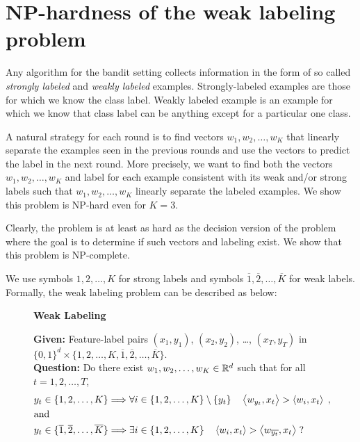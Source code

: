 \section{NP-hardness of the weak labeling problem}
\label{section:np-hardness-of-weak-labeling-problem}

Any algorithm for the bandit setting collects information in the form of so
called \emph{strongly labeled} and \emph{weakly labeled} examples.
Strongly-labeled examples are those for which we know the class label. Weakly
labeled example is an example for which we know that class label can be anything
except for a particular one class.

A natural strategy for each round is to find vectors $w_1, w_2, \dots, w_K$ that
linearly separate the examples seen in the previous rounds and use the vectors
to predict the label in the next round. More precisely, we want to find both the
vectors $w_1, w_2, \dots, w_K$ and label for each example consistent with its
weak and/or strong labels such that $w_1, w_2, \dots, w_K$ linearly separate the
labeled examples. We show this problem is NP-hard even for $K=3$.

Clearly, the problem is at least as hard as the decision version of the problem
where the goal is to determine if such vectors and labeling exist. We show that
this problem is NP-complete.

We use symbols $1,2,\dots,K$ for strong labels and symbols $\overline{1},
\overline{2}, \dots, \overline{K}$ for weak labels. Formally, the weak
labeling problem can be described as below:
\begin{figure}[H]
\begin{framed}
\begin{center}
    \textbf{Weak Labeling}
\end{center}
\textbf{Given:} Feature-label pairs $(x_1, y_1)$, $(x_2, y_2)$, \dots, $(x_T, y_T)$ in $\{0,1\}^d \times \{1,2,\dots, K, \overline{1}, \overline{2}, \dots, \overline{K}\}$. \\
\textbf{Question:} Do there exist $ w_1, w_2, \dots, w_K \in \mathbb{R}^d$ such that for all $t=1,2,\dots,T$,
\begin{align*}
& y_t \in \{1,2,\dots,K\} \Longrightarrow \forall i \in \{1,2,\dots,K\} \setminus \{y_t\} \quad \left\langle w_{y_t}, x_t \right\rangle  > \left\langle w_i, x_t \right\rangle \; , \\
& \text{and} \\
& y_t \in \{\overline{1}, \overline{2},\dots, \overline{K}\} \Longrightarrow \exists i \in \{1,2,\dots,K\} \quad \left\langle w_i, x_t \right\rangle > \left\langle w_{\overline{y_t}}, x_t \right\rangle \; ?
\end{align*}
\end{framed}
\end{figure}

